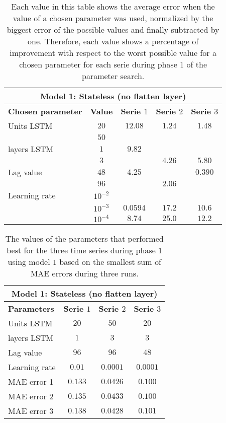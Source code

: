 \begin{table}[ht]
	\centering
	\begin{tabular}{@{}l||c|ccc@{}} \toprule
		\multicolumn{5}{c}{Model 1: Stateless (no flatten layer)}\\\midrule\midrule
		\textbf{Chosen parameter}	& \textbf{Value} & \textbf{Serie $ 1 $} & \textbf{Serie $ 2 $} & \textbf{Serie $ 3 $}\\\midrule
		Units LSTM & $ 20 $ & $12.08 $		&$ 1.24 $  & $1.48 $\\
		 		   & $ 50 $ & 		  		&		   & 		\\\hline
		layers LSTM & $ 1 $ & $9.82 $		&		   & 		\\
				    & $ 3 $ & 	      		&$ 4.26 $  & $5.80$\\\hline
		Lag value & $ 48 $ & $4.25 $ 		&		   & $0.390$\\
				  & $ 96 $ &          		&$ 2.06 $  & 		\\\hline
		Learning rate & $ 10^{-2} $ &       &		   & 		\\
					& $  10^{-3} $ &$0.0594 $&$ 17.2$  & $10.6$\\
					& $  10^{-4} $ &$8.74 $&$ 25.0$    & $12.2$\\\bottomrule
			
	\end{tabular}
	\caption{Each value in this table shows the average error when the value of a chosen parameter was used, normalized by the biggest error of the possible values and finally subtracted by one. Therefore, each value shows a percentage of improvement with respect to the worst possible value for a chosen parameter for each serie during phase $ 1 $ of the parameter search.}
	\label{tab:relative_performance_parameters_phase_one_model_one}
\end{table}


\begin{table}[ht]
	\centering
	\begin{tabular}{@{}l|ccc@{}} \toprule
		\multicolumn{4}{c}{Model 1: Stateless (no flatten layer)}\\\midrule\midrule
		\textbf{Parameters}	& \textbf{Serie $ 1 $} & \textbf{Serie $ 2 $} & \textbf{Serie $ 3 $}\\\midrule
		Units LSTM & $20 $&$ 50 $  & $20 $\\
		layers LSTM & $1 $&$ 3 $  & $3$\\
		Lag value & $96 $&$ 96$  & $48$\\
		Learning rate & $0.01 $&$ 0.0001$  & $0.0001$\\\hline
		MAE error 1   & $ 0.133 $ & $ 0.0426 $ & $ 0.100 $\\
		MAE error 2   & $ 0.135 $ & $ 0.0433 $ & $ 0.100 $\\
		MAE error 3   & $ 0.138 $ & $ 0.0428 $ & $ 0.101 $\\\bottomrule
	\end{tabular}
	\caption{The values of the parameters that performed best for the three time series during phase $ 1 $ using model $ 1 $ based on the smallest sum of MAE errors during three runs.}
	\label{tab:best_performing_para_phase1}
\end{table}


